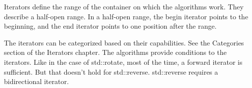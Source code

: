 Iterators define the range of the container on which the algorithms work. They describe a half-open range. In a half-open range, the begin iterator points to the beginning, and the end iterator points to one position after the range.

The iterators can be categorized based on their capabilities. See the Categories section of the Iterators chapter. The algorithms provide conditions to the iterators. Like in the case of std::rotate, most of the time, a forward iterator is sufficient. But that doesn’t hold for std::reverse. std::reverse requires a bidirectional iterator.

















